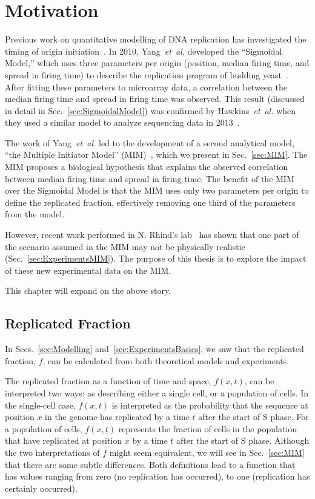 \chapter{Motivation}
\label{ch:Motivation}

Previous work on quantitative modelling of DNA replication has investigated the timing of origin initiation~\cite{ScottsPaper,deMouraModel1,StochasticTermination,Goldar2009,OriginTimingReview}.
In 2010, Yang~\emph{et~al.} developed the ``Sigmoidal Model,'' which uses three parameters per origin (position, median firing time, and spread in firing time) to describe the replication program of budding yeast~\cite{ScottsPaper}.
After fitting these parameters to microarray data, a correlation between the median firing time and spread in firing time was observed.
This result (discussed in detail in Sec.~\ref{sec:SigmoidalModel}) was confirmed by Hawkins~\emph{et~al.} when they used a similar model to analyze sequencing data in 2013~\cite{StochasticTermination}.

The work of Yang~\emph{et~al.} led to the development of a second analytical model, ``the Multiple Initiator Model'' (MIM)~\cite{ScottsPaper}, which we present in Sec.~\ref{sec:MIM}.
The MIM proposes a biological hypothesis that explains the observed correlation between median firing time and spread in firing time.
The benefit of the MIM over the Sigmoidal Model is that the MIM uses only two parameters per origin to define the replicated fraction, effectively removing one third of the parameters from the model.

However, recent work performed in N. Rhind's lab~\cite{Rhind} has shown that one part of the scenario assumed in the MIM may not be physically realistic (Sec.~\ref{sec:ExperimentsMIM}).
The purpose of this thesis is to explore the impact of these new experimental data on the MIM.

This chapter will expand on the above story.


	\section{Replicated Fraction}
	\label{sec:ReplicatedFraction}
	
	In Secs.~\ref{sec:Modelling} and~\ref{sec:ExperimentsBasics}, we saw that the replicated fraction, $f$, can be calculated from both theoretical models and experiments.
	
	The replicated fraction as a function of time and space, $f(x,t)$, can be interpreted two ways:
	as describing either a single cell, or a population of cells.
	In the single-cell case, $f(x,t)$ is interpreted as the probability that the sequence at position $x$ in the genome has replicated by a time $t$ after the start of S phase.
	For a population of cells, $f(x,t)$ represents the fraction of cells in the population that have replicated at position $x$ by a time $t$ after the start of S phase.
	Although the two interpretations of $f$ might seem equivalent, we will see in Sec.~\ref{sec:MIM} that there are some subtle differences.
	Both definitions lead to a function that has values ranging from zero (no replication has occurred), to one (replication has certainly occurred).
	
